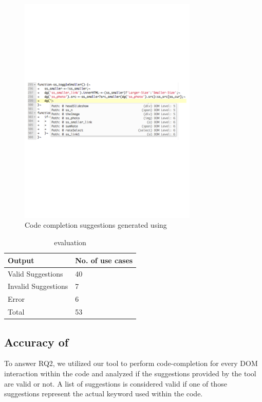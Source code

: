 	
	\begin{figure}
		\centering
		\includegraphics[width=85mm]{images/accuracy.pdf}
		\caption{Code completion suggestions generated using \dompletion}
		\label{Fig:Accuracy}
	\end{figure}
	
	\begin{table}
	{
		\scriptsize
		\begin{tabular}{ p{3.8cm} | p{3.8cm}}
  			\hline                        
  			\textbf{Output} & \textbf{No. of use cases} \\ \hline \hline
  			Valid Suggestions &  40 \\ \hline
			Invalid Suggestions & 7 \\ \hline
			Error & 6 \\ \hline
			Total & 53 \\ 
			\hline  
		\end{tabular}
	}
	\caption {\dompletion evaluation}
	\label{Table:Accuracy}		
	\end{table}
	
	
	
	
	\subsection{Accuracy of \dompletion}
	\label{Sec:Accuracy}
	To answer RQ2, we utilized our tool to perform code-completion for every DOM interaction within the \javascript code and analyzed if the suggestions provided by the tool are valid or not. A list of suggestions is considered valid if one of those suggestions represent the actual keyword used within the code.
	
